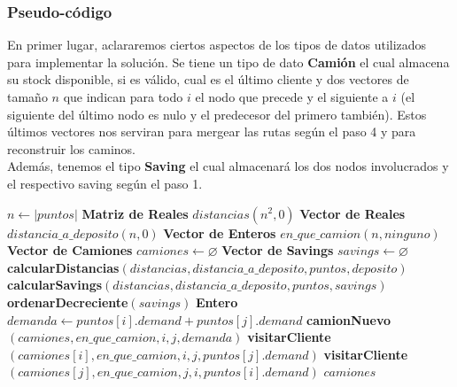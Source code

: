 \subsubsection{Pseudo-código}
En primer lugar, aclararemos ciertos aspectos de los tipos de datos utilizados para implementar la solución. Se tiene un tipo de dato \textbf{Camión} el cual almacena su stock disponible, si es válido, cual es el último cliente y dos vectores de tamaño $n$ que indican para todo $i$ el nodo que precede y el siguiente a $i$ (el siguiente del último nodo es nulo y el predecesor del primero también). Estos últimos vectores nos serviran para mergear las rutas según el paso 4 y para reconstruir los caminos. \\
Además, tenemos el tipo \textbf{Saving} el cual almacenará los dos nodos involucrados y el respectivo saving según el paso 1.

\begin{algorithm}[H]
	\caption{\Comment $\mathcal{O}(n^{3})$}
	\begin{algorithmic}[1]
		\State $n \gets |puntos|$
		\State \textbf{Matriz de Reales} $distancias\mathcal{}(n^{2}, 0)$
		\State \textbf{Vector de Reales} $distancia\_a\_deposito\mathcal{}(n, 0)$
		\State \textbf{Vector de Enteros} $en\_que\_camion\mathcal{}(n, ninguno)$
		\State \textbf{Vector de Camiones} $camiones \gets \varnothing$
		\State \textbf{Vector de Savings} $savings \gets \varnothing$
		\Statex
		\State \textbf{calcularDistancias}$(distancias, distancia\_a\_deposito, puntos, deposito)$ 
		\State \textbf{calcularSavings}$(distancias, distancia\_a\_deposito, puntos, savings)$ 
		\State \textbf{ordenarDecreciente}$(savings)$
		\Statex
		\State \textbf{Entero } $demanda \gets  puntos[i].demand + puntos[j].demand$
		\State \textbf{camionNuevo}$(camiones, en\_que\_camion, i, j, demanda)$
		\EndIf
		\EndIf
		\State \textbf{visitarCliente}$(camiones[i], en\_que\_camion, i, j, puntos[j].demand)$
		\EndIf
		\EndIf
		\State \textbf{visitarCliente}$(camiones[j], en\_que\_camion, j, i, puntos[i].demand)$
		\EndIf
		\EndIf
		\EndIf
		\EndIf
		\EndFor
		\Statex
		\State \Return $camiones$
		\EndFunction
	\end{algorithmic}
\end{algorithm}

